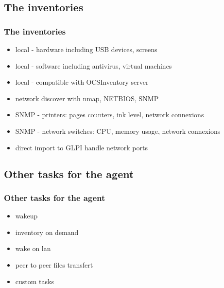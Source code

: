 \documentclass{beamer}
\begin{document}
\subsection{The inventories}
\begin{frame}
\frametitle{The inventories}

\begin{itemize}
%
\item local - hardware including USB devices, screens
\item local - software including antivirus, virtual machines
\item local - compatible with OCSInventory server
\item network discover with nmap, NETBIOS, SNMP
\item SNMP - printers: pages counters, ink level, network connexions
\item SNMP - network switches: CPU, memory usage, network connexions
\item direct import to GLPI handle network ports
%
\end{itemize}
\end{frame}
\subsection{Other tasks for the agent}


\begin{frame}
\frametitle{Other tasks for the agent}
%
\begin{itemize}
%
\item wakeup
\item inventory on demand
\item wake on lan
\item peer to peer files transfert
\item custom tasks
%
\end{itemize}
\end{frame}
\end{document}
